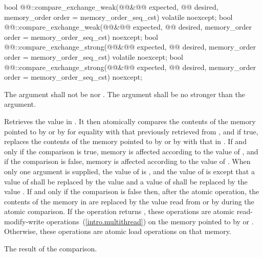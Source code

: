 \begin{itemdecl}
bool @@::compare_exchange_weak(@@&@\itcorr[-1]@ expected, @@ desired,
    memory_order order = memory_order_seq_cst) volatile noexcept;
bool @@::compare_exchange_weak(@@&@\itcorr[-1]@ expected, @@ desired,
    memory_order order = memory_order_seq_cst) noexcept;
bool @@::compare_exchange_strong(@@&@\itcorr[-1]@ expected, @@ desired,
    memory_order order = memory_order_seq_cst) volatile noexcept;
bool @@::compare_exchange_strong(@@&@\itcorr[-1]@ expected, @@ desired,
    memory_order order = memory_order_seq_cst) noexcept;
\end{itemdecl}

\begin{itemdescr}
\pnum
\requires The  argument shall not be  nor
. The  argument shall be no stronger than the
 argument.

\pnum
\effects Retrieves the value in . It then atomically
compares the contents of the memory pointed to by  or by 
for equality with that previously retrieved from ,
and if true, replaces the contents of the memory pointed to
by  or by  with that in .
If and only if the comparison is true, memory is affected according to the
value of , and if the comparison is false, memory is affected according
to the value of . When only one  argument is
supplied, the value of  is , and the value of
 is  except that a value of 
shall be replaced by the value  and a value of
 shall be replaced by the value
.
If and only if the comparison is false then, after the atomic operation,
the contents of the memory in  are replaced by the value
read from  or by  during the atomic comparison.
If the operation returns , these
operations are atomic read-modify-write
operations~(\ref{intro.multithread}) on the memory
pointed to by  or .
Otherwise, these operations are atomic load operations on that memory.

\pnum
\returns The result of the comparison.


\end{itemdescr}
